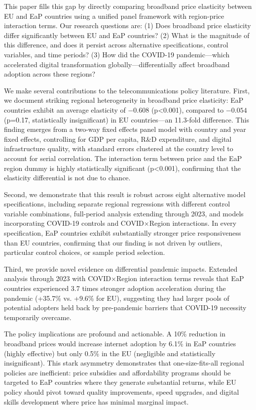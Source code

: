 \documentclass[12pt,review]{elsarticle}
\begin{document}
This paper fills this gap by directly comparing broadband price elasticity between EU and EaP countries using a unified panel framework with region-price interaction terms. Our research questions are: (1) Does broadband price elasticity differ significantly between EU and EaP countries? (2) What is the magnitude of this difference, and does it persist across alternative specifications, control variables, and time periods? (3) How did the COVID-19 pandemic—which accelerated digital transformation globally—differentially affect broadband adoption across these regions?

We make several contributions to the telecommunications policy literature. First, we document striking regional heterogeneity in broadband price elasticity: EaP countries exhibit an average elasticity of $-0.608$ (p<0.001), compared to $-0.054$ (p=0.17, statistically insignificant) in EU countries—an 11.3-fold difference. This finding emerges from a two-way fixed effects panel model with country and year fixed effects, controlling for GDP per capita, R\&D expenditure, and digital infrastructure quality, with standard errors clustered at the country level to account for serial correlation. The interaction term between price and the EaP region dummy is highly statistically significant (p<0.001), confirming that the elasticity differential is not due to chance.

Second, we demonstrate that this result is robust across eight alternative model specifications, including separate regional regressions with different control variable combinations, full-period analysis extending through 2023, and models incorporating COVID-19 controls and COVID$\times$Region interactions. In every specification, EaP countries exhibit substantially stronger price responsiveness than EU countries, confirming that our finding is not driven by outliers, particular control choices, or sample period selection.

Third, we provide novel evidence on differential pandemic impacts. Extended analysis through 2023 with COVID$\times$Region interaction terms reveals that EaP countries experienced 3.7 times stronger adoption acceleration during the pandemic (+35.7\% vs. +9.6\% for EU), suggesting they had larger pools of potential adopters held back by pre-pandemic barriers that COVID-19 necessity temporarily overcame.

The policy implications are profound and actionable. A 10\% reduction in broadband prices would increase internet adoption by 6.1\% in EaP countries (highly effective) but only 0.5\% in the EU (negligible and statistically insignificant). This stark asymmetry demonstrates that one-size-fits-all regional policies are inefficient: price subsidies and affordability programs should be targeted to EaP countries where they generate substantial returns, while EU policy should pivot toward quality improvements, speed upgrades, and digital skills development where price has minimal marginal impact.
\end{document}
